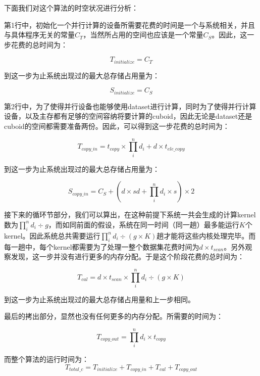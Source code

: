 下面我们对这个算法的时空状况进行分析：

第1行中，初始化一个并行计算的设备所需要花费的时间是一个与系统相关，并且与具体程序无关的常量$C_T$，当然所占用的空间也应该是一个常量$C_S$。因此，这一步花费的总时间为：

\begin{equation}
T_{initialize} = C_T
\end{equation}

到这一步为止系统出现过的最大总存储占用量为：

\begin{equation}
S_{initialize} = C_S
\end{equation}

第2行中，为了使得并行设备也能够使用dataset进行计算，同时为了使得并行计算设备，以及主存都有足够的空间容纳将要计算的cuboid，因此无论是dataset还是cuboid的空间都需要准备两份。因此，可以得到这一步花费的总时间为：

\begin{equation}
T_{copy\_in} = t_{copy} \times \prod_{i}^{n} d_i + d \times t_{ele\_copy}
\end{equation}

到这一步为止系统出现过的最大总存储占用量为：

\begin{equation}
S_{copy\_in} = C_S + (d \times sd + \prod_{i}^{n} d_i \times s) \times 2
\end{equation}

接下来的循环节部分，我们可以算出，在这种前提下系统一共会生成的计算kernel数为$\prod_{i}^{n} d_i \div g$，而如同前面的假设，系统在同一时间（同一趟）最多能运行$K$个kernel。因此系统总共需要运行$\prod_{i}^{n} d_i \div (g \times K)$趟才能将这些内核处理完毕。而每一趟中，每个kernel都需要为了处理一整个数据集花费时间为$d \times t_{scan}$。另外观察发现，这一步并没有进行更多的内存分配。于是这个阶段花费的总时间为：

\begin{equation}
T_{cal} = d \times t_{scan} \times \prod_{i}^{n} d_i \div (g \times K)
\end{equation}

到这一步为止系统出现过的最大总存储占用量和上一步相同。

最后的拷出部分，显然也没有任何更多的内存分配。所需要的时间为：

\begin{equation}
T_{copy\_out} = \prod_{i}^{n} d_i \times t_{copy}
\end{equation}

而整个算法的运行时间为：
\begin{equation}
T_{total\_c} = 
T_{initialize} + T_{copy\_in} + T_{cal} + T_{copy\_out}
\end{equation}

